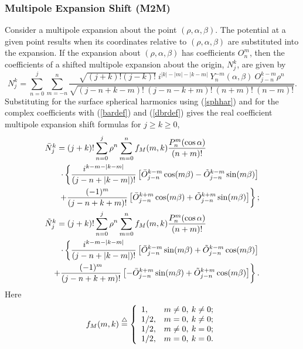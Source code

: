 \subsubsection{Multipole Expansion Shift (M2M)}

Consider a multipole expansion about the point
$(\rho, \alpha, \beta)$. The potential at a given point results when its
coordinates relative to $(\rho, \alpha, \beta)$ are substituted into
the expansion. If the expansion about $(\rho, \alpha, \beta)$
has coefficients $O_n^m$, then the coefficients of a shifted multipole
expansion about the origin, $N_j^k$, are given by
\begin{equation}
N_j^k = \sum_{n=0}^j\sum_{m=-n}^n\frac{\sqrt{(j+k)!(j-k)!}\:i^{|k|-|m|-|k-m|}\:Y_n^{-m}(\alpha, \beta)\:O_{j-n}^{k-m}\rho^n}{\sqrt{(j-n+k-m)!\:(j-n-k+m)!\:(n+m)!\:(n-m)!}}.
\end{equation}
Substituting for the surface
spherical harmonics using (\ref{sphhar}) and for the
complex coefficients with (\ref{bardef}) and (\ref{dbrdef}) gives the real
coefficient multipole expansion shift formulas for
$j\geq k\geq 0$, 
\begin{eqnarray}
\lefteqn{\Nb{j}{k}=
(j+k)!\sum_{n=0}^j\rho^n\sum_{m=0}^nf_{M}(m, k)
\frac{P_n^{m}(\cos\alpha)}{(n+m)!}}\nonumber\\
&&\cdot\left\{\frac{i^{k-m-|k-m|}}{(j-n+|k-m|)!}
\left[\Ob{j-n}{k-m}\cos(m\beta)-\Obb{j-n}{k-m}\sin(m\beta)\right]\right.
\nonumber\\
&&\left.+\frac{(-1)^m}{(j-n+k+m)!}
\left[\Ob{j-n}{k+m}\cos(m\beta)+\Obb{j-n}{k+m}\sin(m\beta)\right]\right\};
\\
\lefteqn{\Nbb{j}{k}=
(j+k)!\sum_{n=0}^j\rho^n\sum_{m=0}^nf_{M}(m, k)
\frac{P_n^{m}(\cos\alpha)}{(n+m)!}}\nonumber\\
&&\cdot\left\{\frac{i^{k-m-|k-m|}}{(j-n+|k-m|)!}
\left[\Ob{j-n}{k-m}\sin(m\beta)+\Obb{j-n}{k-m}\cos(m\beta)\right]\right.
\nonumber\\
&&\left.+\frac{(-1)^m}{(j-n+k+m)!}
\left[-\Ob{j-n}{k+m}\sin(m\beta)+\Obb{j-n}{k+m}\cos(m\beta)\right]\right\}.
\end{eqnarray}
Here
\begin{equation}
f_{M}(m, k)\stackrel{\triangle}{=} \left\{
\begin{array}{ll}
1,&m\neq 0,\: k\neq 0;\\
1/2,&m=0,\: k\neq 0;\\
1/2,&m\neq 0,\: k=0;\\
1/2,&m=0,\: k=0.
\end{array}\right.
\end{equation}

